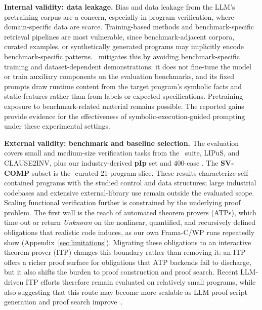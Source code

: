 \smallskip
\noindent\textbf{Internal validity: data leakage.}
Bias and data leakage from the LLM's pretraining corpus are a concern,
especially in program verification, where domain-specific data are scarce.
Training-based methods and benchmark-specific retrieval pipelines are most
vulnerable, since benchmark-adjacent corpora, curated examples, or synthetically
generated programs may implicitly encode benchmark-specific patterns.
\toolname\ mitigates this by avoiding benchmark-specific training and
dataset-dependent demonstrations: it does not fine-tune the model or train
auxiliary components on the evaluation benchmarks, and its fixed prompts draw
runtime content from the target program's symbolic facts and static features
rather than from labels or expected specifications. Pretraining exposure to benchmark-related material remains possible. The reported gains provide evidence for the effectiveness of symbolic-execution-guided prompting under these experimental settings.

\smallskip
\noindent\textbf{External validity: benchmark and baseline selection.}
The evaluation covers small and medium-size verification tasks from the \autospec\ suite, LIPuS, and CLAUSE2INV, plus our industry-derived \textbf{pIp} set and 400-case \textbf{}. The \textbf{SV-COMP} subset is the \autospec-curated 21-program slice. These results characterize self-contained programs with the studied control and data structures; large industrial codebases and extensive external-library use remain outside the evaluated scope. Scaling functional verification further is constrained by the underlying proof problem. The first wall is the reach of automated theorem provers (ATPs), which
time out or return \emph{Unknown} on the nonlinear, quantified, and recursively
defined obligations that realistic code induces, as our own Frama-C/WP runs
repeatedly show (Appendix~\ref{sec:limitations}). Migrating these obligations to
an interactive theorem prover (ITP) changes this boundary rather than removing
it: an ITP offers a richer proof surface for obligations that ATP backends fail
to discharge, but it also shifts the burden to proof construction and proof
search. Recent LLM-driven ITP efforts therefore remain evaluated on relatively
small programs, while also suggesting that this route may become more scalable
as LLM proof-script generation and proof search improve~\cite{yang2026how,thakur2025clever,ye2026verina,li2026goedelcodeproverhierarchicalproofsearch}.

